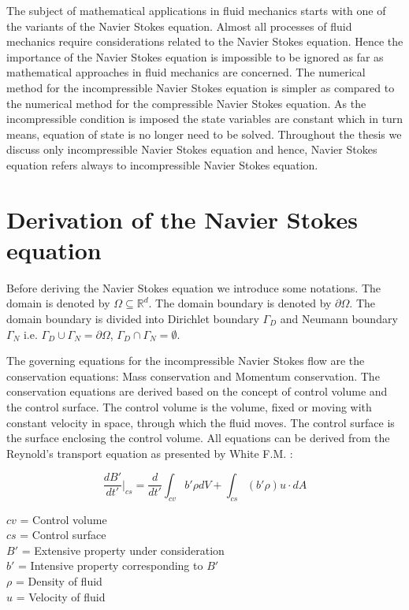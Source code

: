 \documentclass[a4paper]{book}
\begin{document}
The subject of mathematical applications in fluid mechanics starts with  one of the variants of the Navier Stokes equation. Almost all processes of fluid mechanics require considerations related to the Navier Stokes equation. Hence the importance of the Navier Stokes equation is impossible to be ignored as far as mathematical approaches in fluid mechanics are concerned. The numerical method for the incompressible Navier Stokes equation is simpler as compared to the numerical method for the compressible Navier Stokes equation. As the incompressible condition is imposed the state variables are constant which in turn means, equation of state is no longer need to be solved. Throughout the thesis we discuss only incompressible Navier Stokes equation and hence, Navier Stokes equation refers always to incompressible Navier Stokes equation.

\section[Derivation]{Derivation of the Navier Stokes equation}

Before deriving the Navier Stokes equation we introduce some notations. The domain is denoted by $\Omega \subseteq \mathbb{R}^d $. The domain boundary is denoted by $\partial \Omega$. The domain boundary is divided into Dirichlet boundary $\Gamma_D$ and Neumann boundary $\Gamma_N$ i.e. $\Gamma_D \cup \Gamma_N = \partial \Omega $, $\Gamma_D \cap \Gamma_N = \emptyset $. 

The governing equations for the incompressible Navier Stokes flow are the conservation equations: Mass conservation and Momentum conservation. The conservation equations are derived based on the concept of control volume and the control surface. The control volume is the volume, fixed or moving with constant velocity in space, through which the fluid moves. The control surface is the surface enclosing the control volume. All equations can be derived from the Reynold's transport equation as presented by White F.M. \cite{white}:


\begin{equation} \label{rtt} 
\frac{dB'}{dt'}|_{cs} = \frac{d}{dt'} \int_{cv} b' \rho dV + \int_{cs} (b' \rho) u\cdot dA 
\end{equation}

\begin{center}
$cv$ = Control volume\\
$cs$ = Control surface\\
$B'$ = Extensive property under consideration  \\
$b'$ = Intensive property corresponding to $B'$ \\
$\rho$ = Density of fluid \\
$u$ = Velocity of fluid\\
\end{center}
\end{document}
